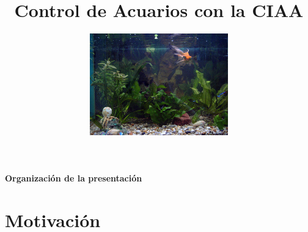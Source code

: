 \documentclass{beamer}
\title[Control de Acuarios]{Control de Acuarios con la CIAA}
\author[Patricio Bos]{\includegraphics[width=6cm]{./imagenes/acuario2}}
\institute[LSE-FIUBA]{Laboratorio de Sistemas Embebidos - FIUBA\\ Ing. Patricio Bos}
\date{}
\begin{document}
\begingroup
\makeatletter
\setlength{\hoffset}{-.5\beamer@sidebarwidth}
\makeatother
\begin{frame}
  \titlepage
\end{frame}

\endgroup



\begin{frame}{\textbf{Organización de la presentación}}
  \tableofcontents
\end{frame}
%
%
%

\section{Motivación}
\end{document}
